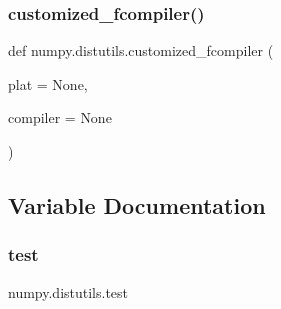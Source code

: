 \subsubsection{\texorpdfstring{customized\+\_\+fcompiler()}{customized\_fcompiler()}}
{\footnotesize\ttfamily def numpy.\+distutils.\+customized\+\_\+fcompiler (\begin{DoxyParamCaption}\item[{}]{plat = {\ttfamily None},  }\item[{}]{compiler = {\ttfamily None} }\end{DoxyParamCaption})}



\subsection{Variable Documentation}
\mbox{\label{namespacenumpy_1_1distutils_acf3248fe3702808ca87d87611d278469}} 
\subsubsection{\texorpdfstring{test}{test}}
{\footnotesize\ttfamily numpy.\+distutils.\+test}

